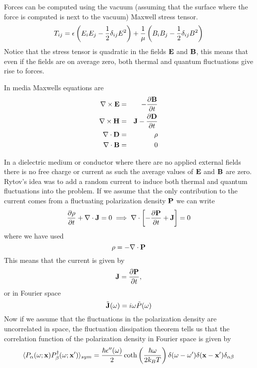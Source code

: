 Forces can be computed using the vacuum (assuming that the surface where the force is computed is next to the vacuum) Maxwell stress tensor.
\begin{equation}
T_{ij}= \epsilon\left(E_iE_j -{1\over 2}\delta_{ij}E^2\right) + {1\over \mu}\left( B_i B_j -{1\over 2}\delta_{ij}B^2\right)
\end{equation}
Notice that the stress tensor is quadratic in the fields ${\bf E}$ and ${\bf B}$, this means that even if the fields are on average zero, both thermal and quantum fluctuations give rise to forces.

In media Maxwells equations are
\begin{eqnarray}
\nabla \times{\bf E} &=& -{\partial {\bf B}\over \partial t} \\
\nabla \times{\bf H} &=& {\bf J}-{\partial {\bf D}\over \partial t} \\
\nabla \cdot {\bf D} &=& \rho\\
\nabla \cdot {\bf B} &=& 0 
\end{eqnarray}

In a dielectric medium or conductor where there are no applied external fields there is no free charge or current as such the average values of ${\bf E}$ and ${\bf B}$ are zero. Rytov's idea was to add a random current to induce both thermal and quantum fluctuations
into the problem. If we assume that the only contribution to the current comes from a fluctuating polarization density ${\bf P}$ we can write
\begin{equation}
{\partial \rho\over \partial t} +\nabla \cdot {\bf J}= 0\implies\nabla\cdot \left[-{\partial {\bf P}\over \partial t} +{\bf J}\right] = 0
\end{equation}
where we have used
\begin{equation}
\rho = -\nabla \cdot {\bf P}
\end{equation}
This means that the current is given by
\begin{equation}
{\bf J}={\partial {\bf P}\over \partial t} ,
\end{equation}
or in Fourier space
\begin{equation}
\tilde {\bf J}(\omega)= i\omega \tilde P(\omega)
\end{equation}
Now if we assume that the fluctuations in the polarization density are uncorrelated in space, the fluctuation dissipation theorem tells us that the correlation function of the polarization density in Fourier space is given by
\begin{equation}
\langle P_\alpha(\omega; {\bf x})P^{\dagger}_\beta(\omega; {\bf x}')\rangle_{sym}=
{\hbar \epsilon''(\omega)\over 2}\coth\left({\hbar\omega\over 2k_B T}\right)\delta(\omega-\omega')\delta({\bf x}-{\bf x}')\delta_{\alpha\beta}
\end{equation}

